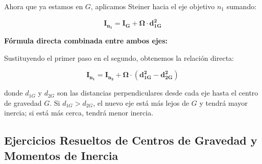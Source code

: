 \begin{ImportanteBox}
\begin{enumerate}
              Ahora que ya estamos en $G$, aplicamos Steiner hacia el eje objetivo $n_1$ sumando:

              \begin{equation}
                  \mathbf{I_{n_1} = I_G + \Omega \cdot d_{1G}^2}
\end{equation}

    \end{enumerate}



    \textbf{Fórmula directa combinada entre ambos ejes:}

    Sustituyendo el primer paso en el segundo, obtenemos la relación directa:

    \begin{equation}
        \mathbf{I_{n_1} = I_{n_2} + \Omega \cdot \left( d_{1G}^2 - d_{2G}^2 \right)}
\end{equation}

    donde $d_{1G}$ y $d_{2G}$ son las distancias perpendiculares desde cada eje hasta el centro de gravedad $G$. Si $d_{1G} > d_{2G}$, el nuevo eje está más lejos de $G$ y tendrá mayor inercia; si está más cerca, tendrá menor inercia.

\end{ImportanteBox}




\subsection{Ejercicios Resueltos de Centros de Gravedad y Momentos de Inercia}



